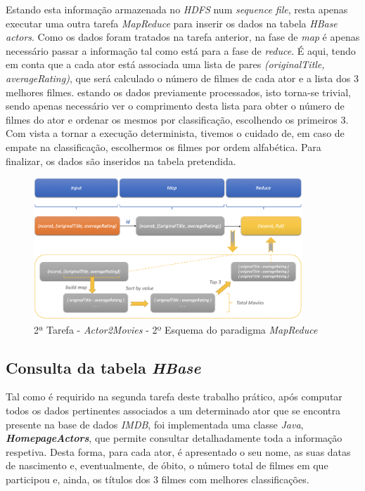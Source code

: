 \documentclass[a4paper]{report}
\begin{document}
{			Estando esta informação armazenada no \textit{HDFS} num \textit{sequence file}, resta apenas executar uma outra tarefa \textit{MapReduce} para inserir os dados na tabela \textit{HBase actors}.
			Como os dados foram tratados na tarefa anterior, na fase de \textit{map} é apenas necessário passar a informação tal como está para a fase de \textit{reduce}. É aqui, tendo em conta que a cada ator está associada uma lista de pares \textit{(originalTitle, averageRating)}, que será calculado o número de filmes de cada ator e a lista dos 3 melhores filmes. estando os dados previamente processados, isto torna-se trivial, sendo apenas necessário ver o comprimento desta lista para obter o número de filmes do ator e ordenar os mesmos por classificação, escolhendo os primeiros 3. Com vista a tornar a execução determinista, tivemos o cuidado de, em caso de empate na classificação, escolhermos os filmes por ordem alfabética.
			Para finalizar, os dados são inseridos na tabela pretendida.
			\begin{figure}[H]
				\centering
				\includegraphics[width=0.9\textwidth]{Imagens/2ª Tarefa - Actor2Movies - 2º Esquema MapReduce.png}
				\caption{2ª Tarefa - \textit{Actor2Movies} - 2º Esquema do paradigma \textit{MapReduce}}
				\label{fig:20}
			\end{figure}

		\subsection{Consulta da tabela \textit{HBase}} \label{subsec:Task2-4}
		Tal como é requirido na segunda tarefa deste trabalho prático, após computar todos os dados pertinentes associados a um determinado ator que se encontra presente na base de dados \textit{IMDB}, foi implementada uma classe \textit{Java}, \textit{\textbf{HomepageActors}}, que permite consultar detalhadamente toda a informação respetiva.
		Desta forma, para cada ator, é apresentado o seu nome, as suas datas de nascimento e, eventualmente, de óbito, o número total de filmes em que participou e, ainda, os títulos dos 3 filmes com melhores classificações.
		
}
\end{document}
